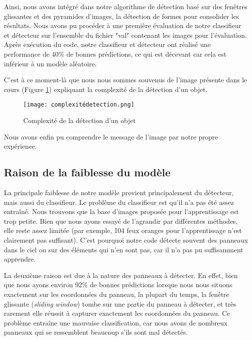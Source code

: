\documentclass[twocolumn,10pt]{article}
\begin{document}
    Ainsi, nous avons intégré dans notre algorithme de détection basé sur des fenêtres glissantes et des pyramides d'images, la détection de formes pour consolider les résultats. Nous avons pu procéder à une première évaluation de notre classifieur et détecteur sur l'ensemble du fichier "val" contenant les images pour l'évaluation. Après exécution du code, notre classifieur et détecteur ont réalisé une performance de 40\% de bonnes prédictions, ce qui est décevant car cela est inférieur à un modèle aléatoire.



    C'est à ce moment-là que nous nous sommes souvenus de l'image présente dans le cours (Figure \ref{fig:complexite-detection}) expliquant la complexité de la détection d'un objet.

    \begin{figure}
        \centering
        \texttt{[image: complexitédetection.png]}
        \caption{Complexité de la détection d'un objet}
        \label{fig:complexite-detection}
    \end{figure}

    Nous avons enfin pu comprendre le message de l'image par notre propre expérience.


    \subsection{Raison de la faiblesse du modèle}

    La principale faiblesse de notre modèle provient principalement du détecteur, mais aussi du classifieur. Le problème du classifieur est qu'il n'a pas été assez entraîné. Nous trouvons que la base d'images proposée pour l'apprentissage est trop petite. Bien que nous ayons essayé de l'agrandir par différentes méthodes, elle reste assez limitée (par exemple, 104 feux oranges pour l'apprentissage n'est clairement pas suffisant). C'est pourquoi notre code détecte souvent des panneaux dans le ciel ou sur des éléments qui n'en sont pas, car il n'a pas pu suffisamment apprendre.

    La deuxième raison est due à la nature des panneaux à détecter. En effet, bien que nous ayons environ 92\% de bonnes prédictions lorsque nous nous situons exactement sur les coordonnées du panneau, la plupart du temps, la fenêtre glissante (\textit{sliding window}) tombe sur une partie du panneau à détecter, et très rarement elle réussit à capturer exactement les coordonnées du panneau. Ce problème entraîne une mauvaise classification, car nous avons de nombreux panneaux qui se ressemblent beaucoup s'ils sont mal détectés.
\end{document}
